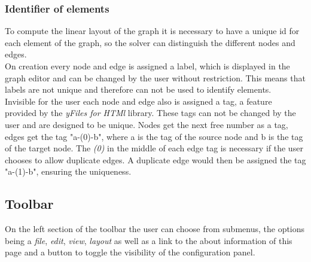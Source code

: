 \subsubsection{Identifier of elements}
To compute the linear layout of the graph it is necessary to have a unique id for each element of the graph, so the solver can distinguish the different nodes and edges.\\
On creation every node and edge is assigned a label, which is displayed in the graph editor and can be changed by the user without restriction. This means that labels are not unique and therefore can not be used to identify elements.\\
Invisible for the user each node and edge also is assigned a tag, a feature provided by the \textit{yFiles for HTMl} library. These tags can not be changed by the user and are designed to be unique. Nodes get the next free number as a tag, edges get the tag "a-(0)-b", where a is the tag of the source node and b is the tag of the target node. The \textit{(0)} in the middle of each edge tag is necessary if the user chooses to allow duplicate edges. A duplicate edge would then be assigned the tag "a-(1)-b", ensuring the uniqueness.
\subsection{Toolbar}
On the left section of the toolbar the user can choose from submenus, the options being a \textit{file}, \textit{edit}, \textit{view}, \textit{layout} as well as a link to the about information of this page and a button to toggle the visibility of the configuration panel.
